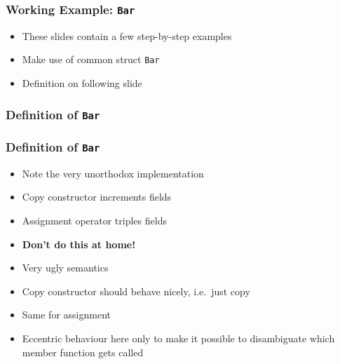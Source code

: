 \begin{frame}
  \frametitle{Working Example: {\tt Bar}}
  \begin{itemize}
    \item These slides contain a few step-by-step examples
    \item Make use of common struct {\tt Bar}
    \item Definition on following slide
  \end{itemize}
\end{frame}

\begin{frame}
  \frametitle{Definition of {\tt Bar}}
\end{frame}

\begin{frame}
  \frametitle{Definition of {\tt Bar}}
  \begin{itemize}
    \item Note the very unorthodox implementation
    \item Copy constructor increments fields
    \item Assignment operator triples fields
    \item \textbf{Don't do this at home!}
    \item Very ugly semantics
    \item Copy constructor should behave nicely, i.e.~just copy
    \item Same for assignment
    \item Eccentric behaviour here only to make it possible to disambiguate which member function gets called
  \end{itemize}
\end{frame}

